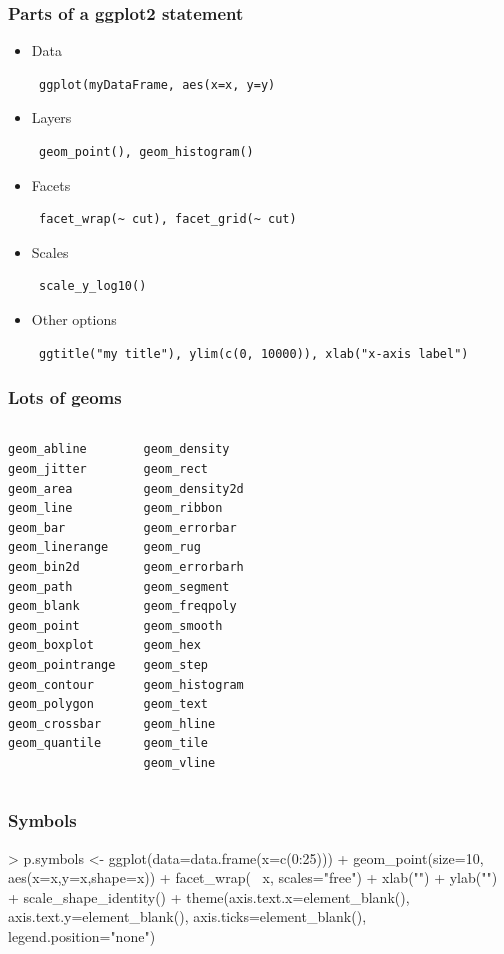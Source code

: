 \documentclass[10pt,slidestop,mathserif,c]{beamer}
\begin{document}
\begin{frame}
	\frametitle{Parts of a ggplot2 statement}
	\begin{itemize}
		\item<+-| alert@+> Data \begin{verbatim} ggplot(myDataFrame, aes(x=x, y=y) \end{verbatim}
		\item<+-| alert@+> Layers \begin{verbatim} geom_point(), geom_histogram() \end{verbatim}
		\item<+-| alert@+> Facets \begin{verbatim} facet_wrap(~ cut), facet_grid(~ cut) \end{verbatim}
		\item<+-| alert@+> Scales \begin{verbatim} scale_y_log10() \end{verbatim}
		\item<+-| alert@+> Other options \begin{verbatim} ggtitle("my title"), ylim(c(0, 10000)), xlab("x-axis label") \end{verbatim}
	\end{itemize}
\end{frame}

\begin{frame}
	\frametitle{Lots of geoms}
	\begin{columns}[c]
	\column{1.5in}
\begin{verbatim} 
geom_abline
geom_jitter
geom_area
geom_line
geom_bar	
geom_linerange
geom_bin2d
geom_path 
geom_blank
geom_point 
geom_boxplot
geom_pointrange 
geom_contour
geom_polygon 
geom_crossbar
geom_quantile 
\end{verbatim}
\column{1.5in}
\begin{verbatim}
geom_density
geom_rect 
geom_density2d
geom_ribbon
geom_errorbar
geom_rug
geom_errorbarh
geom_segment 
geom_freqpoly
geom_smooth 
geom_hex
geom_step
geom_histogram
geom_text 
geom_hline
geom_tile
geom_vline
\end{verbatim}
\end{columns}
\end{frame}


\begin{frame}
    \frametitle{Symbols}
\begin{Schunk}
\begin{Sinput}
> p.symbols <- ggplot(data=data.frame(x=c(0:25))) + 
       geom_point(size=10, aes(x=x,y=x,shape=x)) + 
   	facet_wrap(~ x, scales="free") + 
   	xlab("") + ylab("") +
   	scale_shape_identity() +
   	theme(axis.text.x=element_blank(), 
           axis.text.y=element_blank(), 
           axis.ticks=element_blank(), 
           legend.position="none")
\end{Sinput}
\end{Schunk}
\end{frame}
\end{document}
